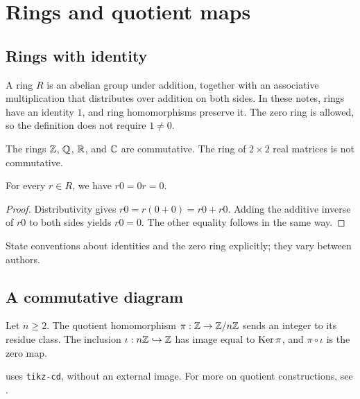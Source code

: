 \documentclass[../../main.tex]{subfiles}
\begin{document}
\chapter{Rings and quotient maps}
\label{ch:rings}

\section{Rings with identity}
\begin{definition}[Ring]\label{def:ring}
A ring $R$ is an abelian group under addition, together with an associative
multiplication that distributes over addition on both sides. In these notes,
rings have an identity $1$, and ring homomorphisms preserve it. The zero ring
is allowed, so the definition does not require $1\ne0$.
\end{definition}

\begin{eg}
The rings $\mathbb Z$, $\mathbb Q$, $\mathbb R$, and $\mathbb C$ are commutative.
The ring of $2\times2$ real matrices is not commutative.
\end{eg}

\begin{prop}\label{prop:ring-zero}
For every $r\in R$, we have $r0=0r=0$.
\end{prop}
\begin{proof}
Distributivity gives $r0=r(0+0)=r0+r0$. Adding the additive inverse of
$r0$ to both sides yields $r0=0$. The other equality follows in the same way.
\end{proof}

\begin{note}
State conventions about identities and the zero ring explicitly;
they vary between authors.
\end{note}

\section{A commutative diagram}
Let $n\ge2$. The quotient homomorphism $\pi:\mathbb Z\to\mathbb Z/n\mathbb Z$ sends an integer
to its residue class. The inclusion $\iota:n\mathbb Z\hookrightarrow\mathbb Z$ has image equal
to $\operatorname{Ker}\pi$, and $\pi\circ\iota$ is the zero map.
\begin{marginfigure}
\centering
{}
\caption{The quotient map sends every multiple of $n$ to zero.}
\label{fig:quotient-map}
\end{marginfigure}
 uses \texttt{tikz-cd}, without an external image.
For more on quotient constructions, see \textcite{judson2020}.
\end{document}
